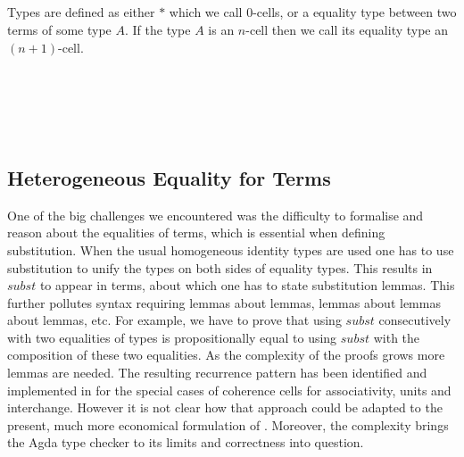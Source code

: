 \begin{code}\>\<%
\\
\>  \<%
\\
\>[0]\<[2]%
\>[2] \<[8]%
\>[8]\AgdaSymbol{:} \<%
\\
\>[0]\<[2]%
\>[2]\AgdaInductiveConstructor{\_,\_} \<[8]%
\>[8]\AgdaSymbol{:} \AgdaSymbol{(} \AgdaSymbol{:} \AgdaSymbol{)(} \AgdaSymbol{:}  \AgdaSymbol{)}  \<%
\\
\>\<\end{code}
Types are defined as either $*$ which we
call $0$-cells, or a equality type between two terms of some type $A$. If the
type $A$ is an $n$-cell then we call its equality type an $(n+1)$-cell.

\begin{code}\>\<%
\\
\>   \<%
\\
\>[0]\<[2]%
\>[2]\AgdaInductiveConstructor{*} \<[8]%
\>[8]\AgdaSymbol{:}  \<%
\\
\>[0]\<[2]%
\>[2] \<[8]%
\>[8]\AgdaSymbol{:} \AgdaSymbol{\{} \AgdaSymbol{:}  \AgdaSymbol{\}(}  \AgdaSymbol{:}  \AgdaSymbol{)}   \<%
\\
\>\<\end{code}

\subsection{Heterogeneous Equality for Terms}\label{sec:het}

One of the big challenges we encountered was the difficulty to
formalise and reason about the equalities of terms, which is
essential when defining substitution. When the usual homogeneous identity types
are used one has to use substitution to unify
the types on both sides of equality types. This results in
$\mathit{subst}$ to appear in terms, about which one has to state
substitution lemmas. This further pollutes syntax requiring lemmas
about lemmas, lemmas about lemmas about lemmas, etc. For example, we
have to prove that using $\mathit{subst}$ consecutively with two equalities
of types is propositionally equal to using $\mathit{subst}$ with the
composition of these two equalities. As the complexity of the proofs
grows more lemmas are needed. The resulting
recurrence pattern has been identified and implemented in
\cite{txa:csl} for the special cases of coherence cells for
associativity, units and interchange. However it is not clear how that
approach could be adapted to the present, much more economical
formulation of {\wog}. Moreover, the complexity brings the
Agda type checker to its limits and correctness into question.

